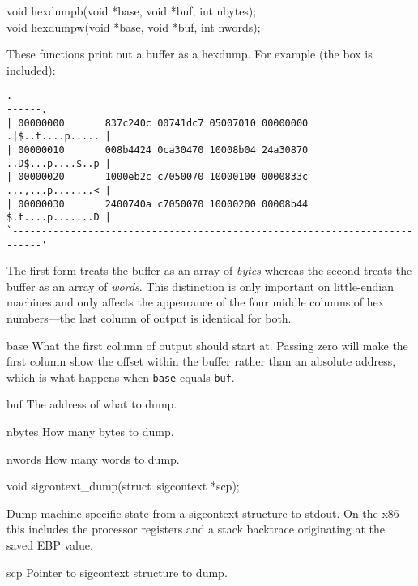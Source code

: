 \label{hexdump}
\begin{apisyn}

        \funcproto void hexdumpb(void *base, void *buf, int nbytes);\\
        \funcproto void hexdumpw(void *base, void *buf, int nwords);
\end{apisyn}
\begin{apidesc}
	These functions print out a buffer as a hexdump.
	For example (the box is included):
	\begin{verbatim}
.---------------------------------------------------------------------------.
| 00000000       837c240c 00741dc7 05007010 00000000       .|$..t....p..... |
| 00000010       008b4424 0ca30470 10008b04 24a30870       ..D$...p....$..p |
| 00000020       1000eb2c c7050070 10000100 0000833c       ...,...p.......< |
| 00000030       2400740a c7050070 10000200 00008b44       $.t....p.......D |
`---------------------------------------------------------------------------'
        \end{verbatim}

	The first form treats the buffer as an array of \emph{bytes} whereas
	the second treats the buffer as an array of \emph{words}.
	This distinction is only important on little-endian machines and
	only affects the appearance of the four middle columns of hex
	numbers---the last column of output is identical for both.

\end{apidesc}
\begin{apiparm}
	\item[base]
		What the first column of output should start at.
		Passing zero will make the first column show the offset
		within the buffer rather than an absolute address,
		which is what happens when \texttt{base} equals \texttt{buf}.
	\item[buf]
		The address of what to dump.
	\item[nbytes]
		How many bytes to dump.
	\item[nwords]
		How many words to dump.
\end{apiparm}

\begin{apisyn}

        \funcproto void sigcontext_dump(struct~sigcontext *scp);
\end{apisyn}
\begin{apidesc}
	Dump machine-specific state from a sigcontext structure to stdout.
	On the x86 this includes the processor registers and a stack
	backtrace originating at the saved EBP value.
\end{apidesc}
\begin{apiparm}
	\item[scp]
		Pointer to sigcontext structure to dump.
\end{apiparm}
